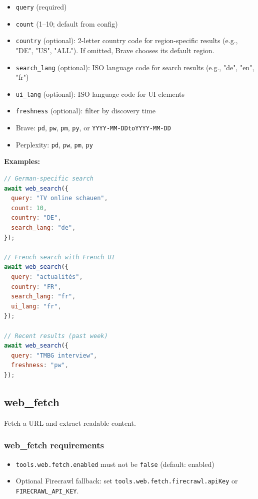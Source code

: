 \begin{itemize}
  \item \texttt{query} (required)
  \item \texttt{count} (1–10; default from config)
  \item \texttt{country} (optional): 2-letter country code for region-specific results (e.g., "DE", "US", "ALL"). If omitted, Brave chooses its default region.
  \item \texttt{search\_lang} (optional): ISO language code for search results (e.g., "de", "en", "fr")
  \item \texttt{ui\_lang} (optional): ISO language code for UI elements
  \item \texttt{freshness} (optional): filter by discovery time
  \item Brave: \texttt{pd}, \texttt{pw}, \texttt{pm}, \texttt{py}, or \texttt{YYYY-MM-DDtoYYYY-MM-DD}
  \item Perplexity: \texttt{pd}, \texttt{pw}, \texttt{pm}, \texttt{py}
\end{itemize}


\textbf{Examples:}

\begin{lstlisting}[language=javascript]
// German-specific search
await web_search({
  query: "TV online schauen",
  count: 10,
  country: "DE",
  search_lang: "de",
});

// French search with French UI
await web_search({
  query: "actualités",
  country: "FR",
  search_lang: "fr",
  ui_lang: "fr",
});

// Recent results (past week)
await web_search({
  query: "TMBG interview",
  freshness: "pw",
});
\end{lstlisting}


\subsection{web\_fetch}


Fetch a URL and extract readable content.

\subsubsection{web\_fetch requirements}


\begin{itemize}
  \item \texttt{tools.web.fetch.enabled} must not be \texttt{false} (default: enabled)
  \item Optional Firecrawl fallback: set \texttt{tools.web.fetch.firecrawl.apiKey} or \texttt{FIRECRAWL\_API\_KEY}.
\end{itemize}


